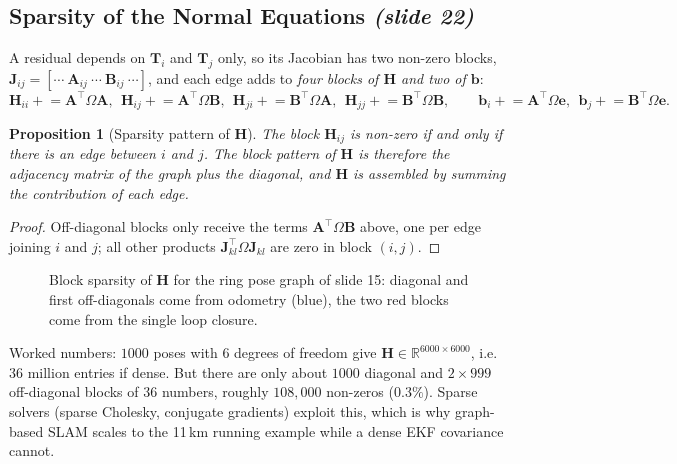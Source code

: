 \documentclass[11pt,a4paper]{article}
\newcommand{\slrs}[1]{\texorpdfstring{\emph{(slide #1)}}{(slide #1)}}
\newcommand{\R}{\mathbb{R}}
\newcommand{\be}{\mathbf{e}}
\newcommand{\bH}{\mathbf{H}}
\newcommand{\bb}{\mathbf{b}}
\newcommand{\bJ}{\mathbf{J}}
\newcommand{\bT}{\mathbf{T}}
\theoremstyle{definition}
\theoremstyle{plain}
\newtheorem{proposition}[definition]{Proposition}
\theoremstyle{remark}
\begin{document}
\subsection{Sparsity of the Normal Equations \slrs{22}}
A residual depends on $\bT_i$ and $\bT_j$ only, so its Jacobian has two non-zero blocks, $\bJ_{ij}=[\cdots\ \mathbf A_{ij}\ \cdots\ \mathbf B_{ij}\ \cdots]$, and each edge adds to \emph{four blocks of $\bH$ and two of $\bb$}:
\[
\bH_{ii}\mathrel{+}=\mathbf A^\top\Omega\mathbf A,\ \ \bH_{ij}\mathrel{+}=\mathbf A^\top\Omega\mathbf B,\ \ \bH_{ji}\mathrel{+}=\mathbf B^\top\Omega\mathbf A,\ \ \bH_{jj}\mathrel{+}=\mathbf B^\top\Omega\mathbf B,\qquad
\bb_i\mathrel{+}=\mathbf A^\top\Omega\be,\ \ \bb_j\mathrel{+}=\mathbf B^\top\Omega\be.
\]
\begin{proposition}[Sparsity pattern of $\bH$]\label{prop:sparse}
The block $\bH_{ij}$ is non-zero if and only if there is an edge between $i$ and $j$. The block pattern of $\bH$ is therefore the adjacency matrix of the graph plus the diagonal, and $\bH$ is assembled by summing the contribution of each edge.
\end{proposition}
\begin{proof}
Off-diagonal blocks only receive the terms $\mathbf A^\top\Omega\mathbf B$ above, one per edge joining $i$ and $j$; all other products $\bJ_{kl}^\top\Omega\bJ_{kl}$ are zero in block $(i,j)$. \qedhere
\end{proof}
\begin{figure}[htbp]\centering
{}
\caption{Block sparsity of $\bH$ for the ring pose graph of slide 15: diagonal and first off-diagonals come from odometry (blue), the two red blocks come from the single loop closure.}
\end{figure}
\begin{intuition}
Worked numbers: $1000$ poses with $6$ degrees of freedom give $\bH\in\R^{6000\times6000}$, i.e.\ $36$ million entries if dense. But there are only about $1000$ diagonal and $2\times999$ off-diagonal blocks of $36$ numbers, roughly $108{,}000$ non-zeros ($0.3\%$). Sparse solvers (sparse Cholesky, conjugate gradients) exploit this, which is why graph-based SLAM scales to the 11\,km running example while a dense EKF covariance cannot.
\end{intuition}
\end{document}
